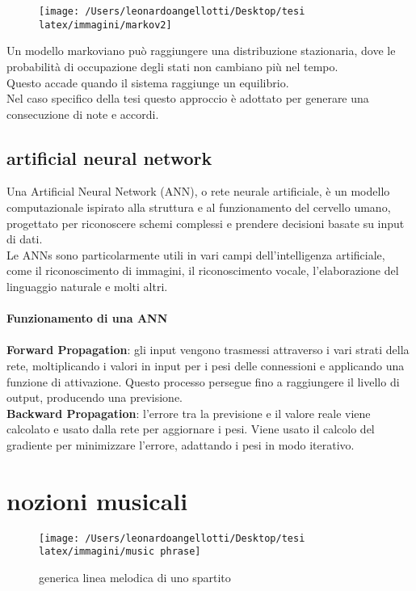 \documentclass[a4paper,12pt]{report}
\begin{document}
\begin{figure}[H]
    \centering
    \texttt{[image: /Users/leonardoangellotti/Desktop/tesi latex/immagini/markov2]} 
    \label{fig:immagine2}
\end{figure}

Un modello markoviano può raggiungere una distribuzione stazionaria, dove le probabilità di occupazione degli stati non cambiano più nel tempo. \\
Questo accade quando il sistema raggiunge un equilibrio. \\
Nel caso specifico della tesi questo approccio è adottato per generare una consecuzione di note e accordi.

\subsection{artificial neural network}

Una Artificial Neural Network (ANN), o rete neurale artificiale, è un modello computazionale ispirato alla struttura e al funzionamento del cervello umano, progettato per riconoscere schemi complessi e prendere decisioni basate su input di dati. \\
Le ANNs sono particolarmente utili in vari campi dell'intelligenza artificiale, come il riconoscimento di immagini, il riconoscimento vocale, l'elaborazione del linguaggio naturale e molti altri. \\
\\
\textbf{Funzionamento di una ANN} \\
\\
\textbf{Forward Propagation}: gli input vengono trasmessi attraverso i vari strati della rete, moltiplicando i valori in input per i pesi delle connessioni e applicando una funzione di attivazione. Questo processo persegue fino a raggiungere il livello di output, producendo una previsione.
\\
\textbf{Backward Propagation}: l'errore tra la previsione e il valore reale viene calcolato e usato dalla rete per aggiornare i pesi. Viene usato il calcolo del gradiente per minimizzare l'errore, adattando i pesi in modo iterativo.

\section{nozioni musicali}

\begin{figure}[H]
    \centering
    \texttt{[image: /Users/leonardoangellotti/Desktop/tesi latex/immagini/music phrase]} 
    \caption{generica linea melodica di uno spartito}
    \label{fig:immagine3}
\end{figure}
\end{document}

